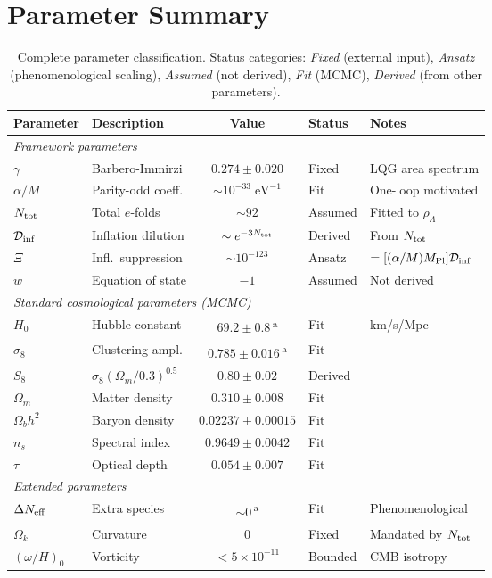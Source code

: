 \documentclass[aps,prd,twocolumn,superscriptaddress,showpacs,preprintnumbers,
  nofootinbib,longbibliography,floatfix]{revtex4-2}
\newcommand{\Dinf}{\mathcal{D}_{\rm inf}}
\newcommand{\MPl}{M_{\rm Pl}}
\newcommand{\Neff}{N_{\rm eff}}
\newcommand{\BI}{\gamma}
\begin{document}
\section{Parameter Summary}\label{app:params}

\begin{table}[t]
\caption{\label{tab:params} Complete parameter classification. Status
categories: \textit{Fixed} (external input), \textit{Ansatz}
(phenomenological scaling), \textit{Assumed} (not derived),
\textit{Fit} (MCMC), \textit{Derived} (from other parameters).}
\begin{ruledtabular}
\begin{tabular}{llcll}
\textbf{Parameter} & \textbf{Description} & \textbf{Value}
  & \textbf{Status} & \textbf{Notes} \\
\hline
\multicolumn{5}{l}{\textit{Framework parameters}} \\
$\BI$ & Barbero-Immirzi & $0.274 \pm 0.020$ & Fixed & LQG area spectrum \\
$\alpha/M$ & Parity-odd coeff. & $\sim 10^{-33}\;\text{eV}^{-1}$
  & Fit & One-loop motivated \\
$N_{\rm tot}$ & Total $e$-folds & $\sim 92$ & Assumed
  & Fitted to $\rho_\Lambda$ \\
$\Dinf$ & Inflation dilution & $\sim e^{-3N_{\rm tot}}$
  & Derived & From $N_{\rm tot}$ \\
$\Xi$ & Infl.\ suppression & $\sim 10^{-123}$
  & Ansatz & $=[(\alpha/M)\MPl]\Dinf$ \\
$w$ & Equation of state & $-1$ & Assumed & Not derived \\
\hline
\multicolumn{5}{l}{\textit{Standard cosmological parameters (MCMC)}} \\
$H_0$ & Hubble constant & $69.2\pm 0.8$\,\textsuperscript{a}
  & Fit & km/s/Mpc \\
$\sigma_8$ & Clustering ampl. & $0.785\pm 0.016$\,\textsuperscript{a}
  & Fit & \\
$S_8$ & $\sigma_8(\Omega_m/0.3)^{0.5}$ & $0.80\pm 0.02$
  & Derived & \\
$\Omega_m$ & Matter density & $0.310 \pm 0.008$ & Fit & \\
$\Omega_b h^2$ & Baryon density & $0.02237 \pm 0.00015$ & Fit & \\
$n_s$ & Spectral index & $0.9649 \pm 0.0042$ & Fit & \\
$\tau$ & Optical depth & $0.054 \pm 0.007$ & Fit & \\
\hline
\multicolumn{5}{l}{\textit{Extended parameters}} \\
$\Delta\Neff$ & Extra species & $\sim 0$\,\textsuperscript{a}
  & Fit & Phenomenological \\
$\Omega_k$ & Curvature & 0 & Fixed & Mandated by $N_{\rm tot}$ \\
$(\omega/H)_0$ & Vorticity & $< 5\times 10^{-11}$
  & Bounded & CMB isotropy \\
\end{tabular}
\end{ruledtabular}
\end{table}
\end{document}
